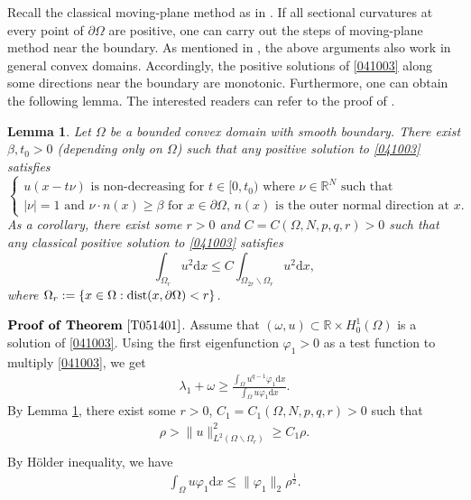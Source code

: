 \documentclass[10pt]{article}
\numberwithin{equation}{section}
\newtheorem{lemma}[theorem]{Lemma}
\newcommand{\ud}{\mathrm{d}}
\numberwithin{equation}{section}
\begin{document}
Recall the classical moving-plane method as in \cite{GNN1979}. If all sectional curvatures at every point of $\partial\Omega$ are positive, one can carry out the steps of moving-plane method near the boundary. As mentioned in \cite{dLN1982}, the above arguments also work in general convex domains. Accordingly, the positive solutions of  \eqref{041003} along some directions near the boundary are monotonic. Furthermore, one can obtain the following lemma.  The interested readers can refer to the proof of \cite[Theorem 1.1]{dLN1982}.
\begin{lemma}\label{2506192013}
Let  $\Omega$ be a bounded convex domain with smooth boundary. There exist $\beta, t_0>0$ (depending only on $\Omega$) such that any positive solution to \eqref{041003} satisfies
\begin{equation}\label{2506192108}
\begin{cases}
u(x-t\nu) \mbox{ is non-decreasing for  $t\in [0, t_0)$ where $\nu\in\mathbb{R}^N$ such that} \\
\mbox{$|\nu|=1$ and $\nu\cdot n(x)\ge \beta$ for $x\in \partial\Omega$, $n(x)$ is the outer normal direction at $x$.}
\end{cases}
\end{equation}
As a corollary,  there exist some $r>0$ and $C=C(\Omega, N, p, q, r)>0$ such that any classical positive solution to \eqref{041003} satisfies
\[
\int_{\Omega_r}u^2 \ud x\le C\int_{\Omega_{2r}\backslash \Omega_r} u^2 \ud x,
\]
where $\Omega_{r}:=\{x\in\Omega: {\rm dist}(x, \partial\Omega)<r\}$.
\end{lemma}

\medskip
\noindent$\mathbf{Proof~of~Theorem~\ref{T051401}}$.  Assume that  $(\omega, u)\subset \mathbb{R}\times H^1_0(\Omega)$ is a solution of \eqref{041003}. Using the first eigenfunction $\varphi_1>0$ as a test function to multiply \eqref{041003}, we get
\begin{equation}\label{2509241809}
\begin{aligned}
\lambda_1+\omega\ge\frac{\int_{\Omega}u^{q-1}\varphi_1 \ud x}
{\int_{\Omega}u\varphi_1 \ud x}.
\end{aligned}
\end{equation}
By Lemma \ref{2506192013}, there exist some $r>0$, $C_1=C_1(\Omega, N, p, q, r)>0$  such that
\begin{equation}\label{2509241810}
\begin{aligned}
\rho>\|u\|^2_{L^2(\Omega\backslash\Omega_r)}\geq C_1\rho.\\
\end{aligned}
\end{equation}
By H\"older inequality, we have
\begin{equation}\label{25092418100}
\begin{aligned}
\int_{\Omega}u\varphi_1 \ud x\leq \|\varphi_1\|_2\rho^{\frac12}.
\end{aligned}
\end{equation}
\end{document}
